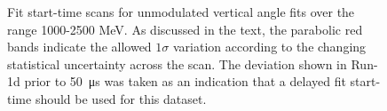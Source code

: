 \begin{figure}[t!]
\centering{}
\hfill

\caption{Fit start-time scans for unmodulated vertical angle fits over the range 1000-2500 MeV. As discussed in the text, the parabolic red bands indicate the allowed $1\sigma$ variation according to the changing statistical uncertainty across the scan. The deviation shown in Run-1d prior to \SI{50}{\micro\second} was taken as an indication that a delayed fit start-time should be used for this dataset.}
\label{fig:BasicFitStartTime}
\end{figure} 

